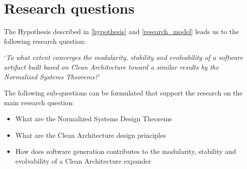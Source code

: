 \section{Research questions} \label{sec:research_questions}
The Hypothesis described in \ref{hypothesis} and \ref{research_model} leads us to the
following research question:

\begin{center}
    \enquote*{\textit{To what extent converges the modularity, stability and evolvability
    of a software artifact built based on Clean Architecture toward a
    similar results by the Normalized Systems Theorems?}}
\end{center}

The following sub-questions can be formulated that support the research on the main
research question:
\begin{itemize}
    \item What are the Normalized Systems Design Theorems
    \item What are the Clean Architecture design principles
    \item How does software generation contributes to the modularity, stability and
    evolvability of a Clean Architecture expander
\end{itemize}